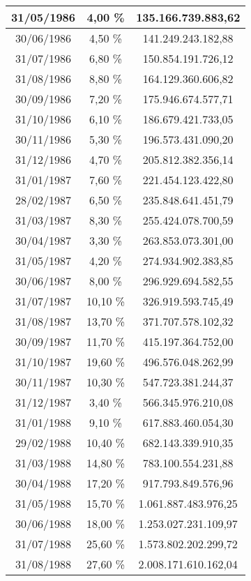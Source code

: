 \begin{center}
\begin{longtable}{|c|c|c|}
31/05/1986 & 4,00 \% & 135.166.739.883,62  \\ \hline
30/06/1986 & 4,50 \% & 141.249.243.182,88  \\ \hline
31/07/1986 & 6,80 \% & 150.854.191.726,12  \\ \hline
31/08/1986 & 8,80 \% & 164.129.360.606,82  \\ \hline
30/09/1986 & 7,20 \% & 175.946.674.577,71  \\ \hline
31/10/1986 & 6,10 \% & 186.679.421.733,05  \\ \hline
30/11/1986 & 5,30 \% & 196.573.431.090,20  \\ \hline
31/12/1986 & 4,70 \% & 205.812.382.356,14  \\ \hline
31/01/1987 & 7,60 \% & 221.454.123.422,80  \\ \hline
28/02/1987 & 6,50 \% & 235.848.641.451,79  \\ \hline
31/03/1987 & 8,30 \% & 255.424.078.700,59  \\ \hline
30/04/1987 & 3,30 \% & 263.853.073.301,00  \\ \hline
31/05/1987 & 4,20 \% & 274.934.902.383,85  \\ \hline
30/06/1987 & 8,00 \% & 296.929.694.582,55  \\ \hline
31/07/1987 & 10,10 \% & 326.919.593.745,49  \\ \hline
31/08/1987 & 13,70 \% & 371.707.578.102,32  \\ \hline
30/09/1987 & 11,70 \% & 415.197.364.752,00  \\ \hline
31/10/1987 & 19,60 \% & 496.576.048.262,99  \\ \hline
30/11/1987 & 10,30 \% & 547.723.381.244,37  \\ \hline
31/12/1987 & 3,40 \% & 566.345.976.210,08  \\ \hline
31/01/1988 & 9,10 \% & 617.883.460.054,30  \\ \hline
29/02/1988 & 10,40 \% & 682.143.339.910,35  \\ \hline
31/03/1988 & 14,80 \% & 783.100.554.231,88  \\ \hline
30/04/1988 & 17,20 \% & 917.793.849.576,96  \\ \hline
31/05/1988 & 15,70 \% & 1.061.887.483.976,25  \\ \hline
30/06/1988 & 18,00 \% & 1.253.027.231.109,97  \\ \hline
31/07/1988 & 25,60 \% & 1.573.802.202.299,72  \\ \hline
31/08/1988 & 27,60 \% & 2.008.171.610.162,04  \\ \hline

\end{longtable}
\end{center}
